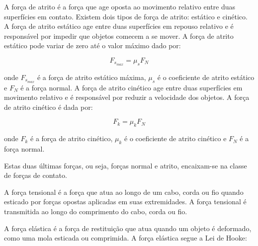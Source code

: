 \documentclass[physics_notes.tex]{subfiles}
\begin{document}
A força de atrito é a força que age oposta ao movimento relativo entre duas superfícies em contato. Existem dois tipos de força de atrito: estático e cinético.
A força de atrito estático age entre duas superfícies em repouso relativo e é responsável por impedir que objetos comecem a se mover. A força de atrito estático pode variar de zero até o valor máximo dado por:

\begin{equation}
	F_{s_{max}} = \mu_s F_N
\end{equation}

onde $F_{s_{max}}$ é a força de atrito estático máxima, $\mu_s$ é o coeficiente de atrito estático e $F_N$ é a força normal.
A força de atrito cinético age entre duas superfícies em movimento relativo e é responsável por reduzir a velocidade dos objetos. A força de atrito cinético é dada por:

\begin{equation}
	F_k = \mu_k F_N
\end{equation}

onde $F_k$ é a força de atrito cinético, $\mu_k$ é o coeficiente de atrito cinético e $F_N$ é a força normal.
\begin{center}
\end{center}

Estas duas últimas forças, ou seja, forças normal e atrito, encaixam-se na classe de forças de contato.

A força tensional é a força que atua ao longo de um cabo, corda ou fio quando esticado por forças opostas aplicadas em suas extremidades. A força tensional é transmitida ao longo do comprimento do cabo, corda ou fio.
\begin{center}
\end{center}

A força elástica é a força de restituição que atua quando um objeto é deformado, como uma mola esticada ou comprimida. A força elástica segue a Lei de Hooke:
\end{document}
